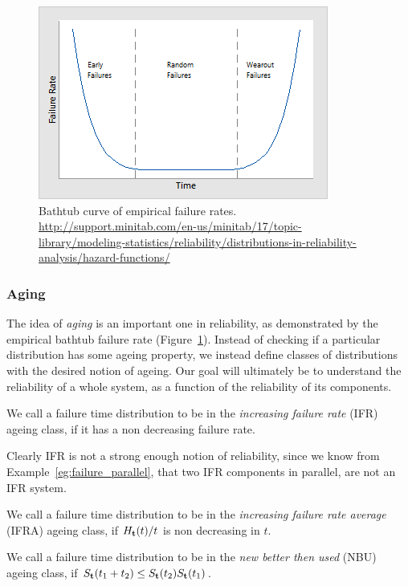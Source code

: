 \begin{figure}[ht]
\centering
\includegraphics[width=0.5\linewidth]{art/bathtub_curve}
\caption{Bathtub curve of empirical failure rates. \newline
\url{http://support.minitab.com/en-us/minitab/17/topic-library/modeling-statistics/reliability/distributions-in-reliability-analysis/hazard-functions/}}
\label{fig:bathtub}
\end{figure}




\subsubsection{Aging}
The idea of \emph{aging} is an important one in reliability, as demonstrated by the empirical bathtub failure rate (Figure~\ref{fig:bathtub}).
Instead of checking if a particular distribution has some ageing property, we instead define classes of distributions with the desired notion of ageing.
Our goal will ultimately be to understand the reliability of a whole system, as a function of the reliability of its components.

\begin{definition}[IFR]
We call a failure time distribution to be in the \emph{increasing failure rate} (IFR) ageing class, if it has a non decreasing failure rate.
\end{definition}

Clearly IFR is not a strong enough notion of reliability, since we know from Example~\ref{eg:failure_parallel}, that two IFR components in parallel, are not an IFR system.


\begin{definition}[IFRA]
We call a failure time distribution to be in the \emph{increasing failure rate average} (IFRA) ageing class, if 
$H_{\mathbf{t}} (t)/t$ is non decreasing in $t$.
\end{definition}

\begin{definition}[NBU]
We call a failure time distribution to be in the \emph{new better then used} (NBU) ageing class, if 
$S_{\mathbf{t}} (t_1+t_2) \leq S_{\mathbf{t}} (t_2) S_{\mathbf{t}} (t_1)$.
\end{definition}


